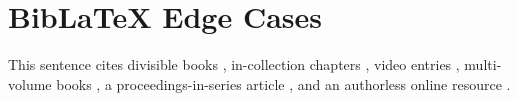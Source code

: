 \documentclass[acmsmall,nonacm,natbib=false]{acmart}
\begin{document}
\thispagestyle{empty}

\section*{BibLaTeX Edge Cases}
This sentence cites divisible books \cite{Editor00,Editor00a}, in-collection
chapters \cite{Spector90,Douglass98}, video entries \cite{Obama08,Novak03},
multi-volume books \cite{MR781536,MR781537}, a proceedings-in-series article
\cite{Hagerup1993}, and an authorless online resource \cite{TUGInstmem}.

\printbibliography
\end{document}
